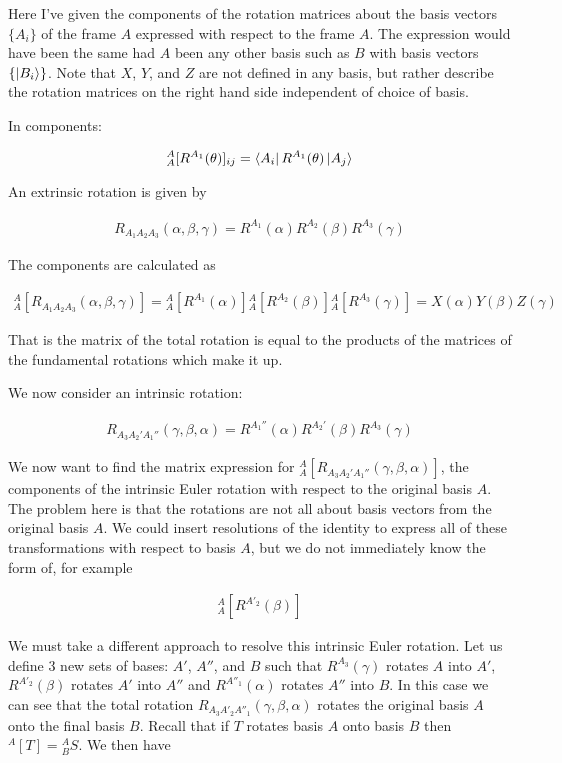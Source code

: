 \documentclass[12pt]{article}
\begin{document}
Here I've given the components of the rotation matrices about the basis vectors $\{A_i\}$ of the frame $A$ expressed with respect to the frame $A$. The expression would have been the same had $A$ been any other basis such as $B$ with basis vectors $\{\ket{B_i}\}$. Note that $X$, $Y$, and $Z$ are not defined in any basis, but rather describe the rotation matrices on the right hand side independent of choice of basis.

In components:

\begin{align}
{^A_A[R^{A_1}(\theta)]_{ij}} = \bra{A_i} R^{A_1}(\theta) \ket{A_j}
\end{align}

An extrinsic rotation is given by 

\begin{align}
R_{A_1 A_2 A_3}(\alpha, \beta, \gamma) = R^{A_1}(\alpha)R^{A_2}(\beta)R^{A_3}(\gamma)
\end{align}

The components are calculated as

\begin{align}
{^A_A[R_{A_1A_2A_3}(\alpha, \beta, \gamma)]} = {^A_A[R^{A_1}(\alpha)]}{^A_A[R^{A_2}(\beta)]}{^A_A[R^{A_3}(\gamma)]} = X(\alpha)Y(\beta)Z(\gamma)
\end{align}

That is the matrix of the total rotation is equal to the products of the matrices of the fundamental rotations which make it up.

We now consider an intrinsic rotation:

\begin{align}
R_{A_3A_2'A_1''}(\gamma, \beta, \alpha) =R^{A_1''}(\alpha) R^{A_2'}(\beta) R^{A_3}(\gamma)
\end{align}

We now want to find the matrix expression for ${^A_A[R_{A_3A_2'A_1''}(\gamma, \beta, \alpha)]}$, the components of the intrinsic Euler rotation with respect to the original basis $A$.
The problem here is that the rotations are not all about basis vectors from the original basis $A$.
We could insert resolutions of the identity to express all of these transformations with respect to basis $A$, but we do not immediately know the form of, for example

\begin{align}
{^A_A[R^{A'_2}(\beta)]}
\end{align}

We must take a different approach to resolve this intrinsic Euler rotation.
Let us define 3 new sets of bases: $A'$, $A''$, and $B$ such that $R^{A_3}(\gamma)$ rotates $A$ into $A'$, $R^{A'_2}(\beta)$ rotates $A'$ into $A''$ and $R^{A''_1}(\alpha)$ rotates $A''$ into $B$.
In this case we can see that the total rotation $R_{A_3 A'_2 A''_1}(\gamma, \beta, \alpha)$ rotates the original basis $A$ onto the final basis $B$.
Recall that if $T$ rotates basis $A$ onto basis $B$ then ${^A[T]} = {^A_B S}$.
We then have
\end{document}
